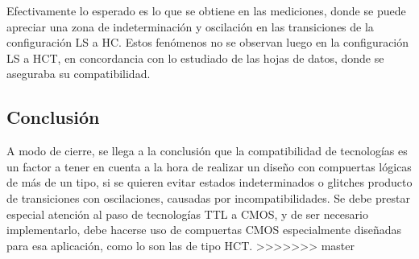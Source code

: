 Efectivamente lo esperado es lo que se obtiene en las mediciones, donde se puede apreciar una zona de indeterminación y oscilación en las transiciones de la configuración 
LS a HC.
Estos fenómenos no se observan luego en la configuración LS a HCT, en concordancia con lo estudiado de las hojas de datos, donde se aseguraba su compatibilidad.



\subsection{Conclusión}
A modo de cierre, se llega a la conclusión que la compatibilidad de tecnologías es un factor a tener en cuenta a la hora de realizar un diseño con compuertas lógicas de 
más de un tipo, si se quieren evitar estados indeterminados o glitches producto de transiciones con oscilaciones, causadas por incompatibilidades.
Se debe prestar especial atención al paso de tecnologías TTL a CMOS, y de ser necesario implementarlo, debe hacerse uso de compuertas CMOS especialmente diseñadas para 
esa aplicación, como lo son las de tipo HCT.
>>>>>>> master
